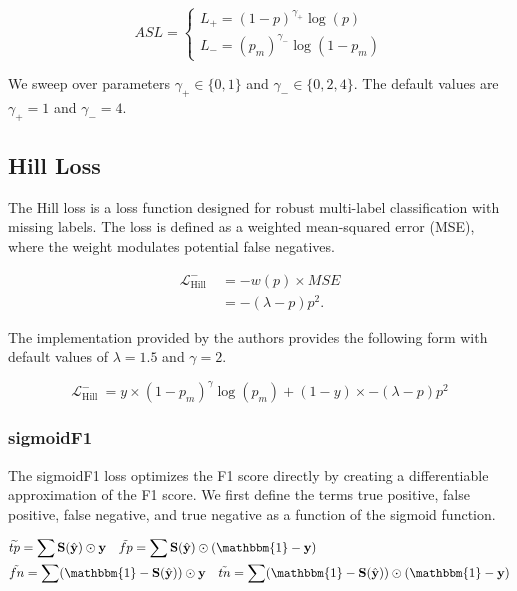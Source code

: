\begin{equation}
  ASL=\left\{
    \begin{array}{l}
      L_{+}=(1-p)^{\gamma_{+}} \log (p) \\
      L_{-}=\left(p_m\right)^{\gamma_{-}} \log \left(1-p_m\right)
    \end{array}\right.
\end{equation}

We sweep over parameters $\gamma_{+} \in \{0, 1\}$ and $\gamma_{-} \in \{0, 2, 4\}$.
The default values are $\gamma_{+}=1$ and $\gamma_{-}=4$.

\subsection{Hill Loss}

The Hill loss \cite{zhang2021simple} is a loss function designed for robust multi-label classification with missing labels.
The loss is defined as a weighted mean-squared error (MSE), where the weight modulates potential false negatives.

\begin{equation}
    \begin{aligned}
    \mathcal{L}_{\text {Hill }}^{-} & =-w(p) \times M S E \\
    & =-(\lambda-p) p^2 .
    \end{aligned}
\end{equation}

The implementation provided by the authors provides the following form with default values of $\lambda=1.5$ and $\gamma=2$.

\begin{equation}
    \mathcal{L}_{\text {Hill }}^{-} = y \times (1-p_{m})^\gamma\log(p_{m}) + (1-y) \times -(\lambda-p){p}^2
\end{equation}

\subsubsection{sigmoidF1}

The sigmoidF1 loss \cite{benedict2021sigmoidf1} optimizes the F1 score directly by creating a differentiable approximation of the F1 score.
We first define the terms true positive, false positive, false negative, and true negative as a function of the sigmoid function.

\begin{equation}
  \begin{aligned}
  & \widetilde{t p}=\sum \mathbf{S}(\hat{\mathbf{y}}) \odot \mathbf{y} \quad
  \tilde{f p}=\sum \mathbf{S}(\hat{\mathbf{y}}) \odot(\mathbbm{1}-\mathbf{y})
  \\
  & \tilde{f n} =\sum(\mathbbm{1}-\mathbf{S}(\hat{\mathbf{y}})) \odot \mathbf{y} \quad
  \tilde{t n}=\sum(\mathbbm{1}-\mathbf{S}(\hat{\mathbf{y}})) \odot(\mathbbm{1}-\mathbf{y})
  \end{aligned}
\end{equation}

